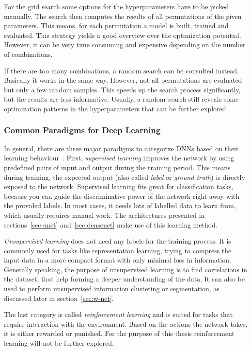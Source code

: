 For the grid search some options for the hyperparameters have to be  picked manually. The search then computes the results of all permutations of the given parameters. This means, for each permutation a model is built, trained and evaluated. This strategy yields a good overview over the optimization potential. However, it can be very time consuming and expensive depending on the number of combinations.

If there are too many combinations, a random search can be consulted instead. Basically it works in the same way. However, not all permutations are evaluated but only a few random samples. This speeds up the search process significantly, but the results are less informative. Usually, a random search still reveals some optimization patterns in the hyperparameters that can be further explored.

\subsubsection{Common Paradigms for Deep Learning}
\label{sec:dl_paradigms}
In general, there are three major paradigms to categorize DNNs based on their learning behaviour~\cite[p.~214f]{dlma14}. First, \emph{supervised learning} improves the network by using predefined pairs of input and output during the training period. This means during training, the expected output (also called \emph{label} or \emph{ground truth}) is directly exposed to the network. Supervised learning fits great for classification tasks, because you can guide the discriminative power of the network right away with the provided labels. In most cases, it needs lots of labelled data to learn from, which usually requires manual work. The architectures presented in sections~\ref{sec:unet} and~\ref{sec:densenet} make use of this learning method.

\emph{Unsupervised learning} does not need any labels for the training process. It is commonly used for tasks like representation learning, trying to compress the input data in a more compact format with only minimal loss in information. Generally speaking, the purpose of unsupervised learning is to find correlations in the dataset, that help forming a deeper understanding of the data. It can also be used to perform unsupervised information clustering or segmentation, as discussed later in section~\ref{sec:w-net}.

The last category is called \emph{reinforcement learning} and is suited for tasks that require interaction with the environment. Based on the actions the network takes, it is either rewarded or punished. For the purpose of this thesis reinforcement learning will not be further explored.

